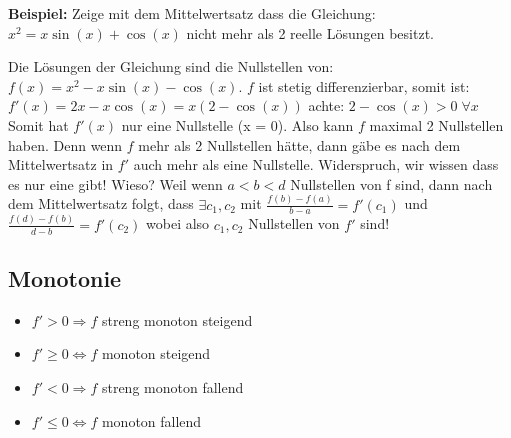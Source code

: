 {\small
\textbf{Beispiel:} 
Zeige mit dem Mittelwertsatz dass die Gleichung:\\
$x^2 = x \sin(x) + \cos(x)$ nicht mehr als 2 reelle Lösungen besitzt.

Die Lösungen der Gleichung sind die Nullstellen von:\\ $f(x) = x^2 - x \sin(x) - \cos(x)$. 
$f$ ist stetig differenzierbar, somit ist:\\ $f'(x) = 2x - x \cos(x) = x(2 - \cos(x))$ \hspace{0.4cm} achte: $2 - \cos(x) > 0 \; \forall x$\\
Somit hat $f'(x)$ nur eine Nullstelle (x = 0). Also kann $f$ maximal 2 Nullstellen haben. Denn wenn $f$ mehr als 2 Nullstellen hätte, dann gäbe es nach dem Mittelwertsatz in $f'$ auch mehr als eine Nullstelle. Widerspruch, wir wissen dass es nur eine gibt! Wieso? Weil wenn $a < b < d$ Nullstellen von f sind, dann nach dem Mittelwertsatz folgt, dass $\exists c_1, c_2$ mit $\frac{f(b) - f(a)}{b-a} = f'(c_1)$ und $\frac{f(d) - f(b)}{d-b} = f'(c_2)$ wobei also $c_1, c_2$ Nullstellen von $f'$ sind!
}


\subsection{Monotonie}
\begin{itemize}
	\item $f' > 0 \Rightarrow f$ streng monoton steigend
	\item $f' \geq 0 \Leftrightarrow f$ monoton steigend
	\item $f' < 0 \Rightarrow f$ streng monoton fallend
	\item $f' \leq 0 \Leftrightarrow f$ monoton fallend
\end{itemize}


